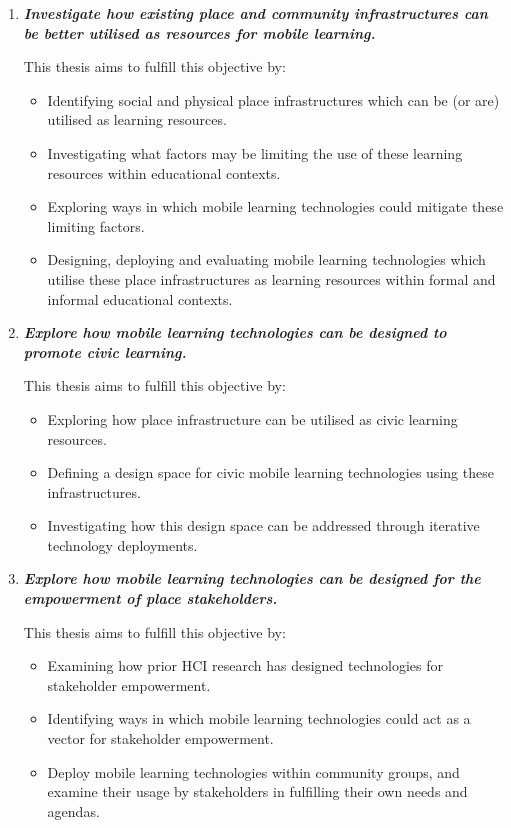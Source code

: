 \begin{enumerate}

\item \textit{\textbf{Investigate how existing place and community infrastructures can be better utilised as resources for mobile learning.}}

This thesis aims to fulfill this objective by:

\begin{itemize}
  \item Identifying social and physical place infrastructures which can be (or are) utilised as learning resources.
  \item Investigating what factors may be limiting the use of these learning resources within educational contexts.
  \item Exploring ways in which mobile learning technologies could mitigate these limiting factors.
  \item Designing, deploying and evaluating mobile learning technologies which utilise these place infrastructures as learning resources within formal and informal educational contexts.
\end{itemize}

\item \textit{\textbf{Explore how mobile learning technologies can be designed to promote civic learning.}}

This thesis aims to fulfill this objective by:

\begin{itemize}
  \item Exploring how place infrastructure can be utilised as civic learning resources.
  \item Defining a design space for civic mobile learning technologies using these infrastructures.
  \item Investigating how this design space can be addressed through iterative technology deployments.
\end{itemize}

\item \textit{\textbf{Explore how mobile learning technologies can be designed for the empowerment of place stakeholders.}}

This thesis aims to fulfill this objective by:

\begin{itemize}
  \item Examining how prior HCI research has designed technologies for stakeholder empowerment.
  \item Identifying ways in which mobile learning technologies could act as a vector for stakeholder empowerment.
  \item Deploy mobile learning technologies within community groups, and examine their usage by stakeholders in fulfilling their own needs and agendas.
\end{itemize}

\end{enumerate}

